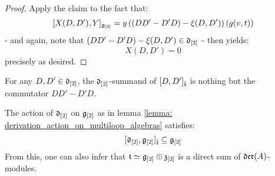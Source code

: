 \begin{proof}
                Apply the claim to the fact that:
                    $$[X(D, D'), Y]_{\mathfrak{g}_{[2]}} = y \left( ( DD' - D'D) - \xi(D, D') \right)( g(v, t) )$$
                - and again, note that $( DD' - D'D) - \xi(D, D') \in \mathfrak{d}_{[2]}$ - then yields:
                    $$X(D, D') = 0$$
                precisely as desired. 
            \end{proof}
        \begin{corollary}
            For any $D, D' \in \mathfrak{d}_{[2]}$, the $\mathfrak{d}_{[2]}$-summand of $[D, D']_{\hat{\mathfrak{t}}}$ is nothing but the commutator $DD' - D'D$.
        \end{corollary} 
        \begin{corollary} \label{coro: derivation_action_on_multiloop_algebras}
            The action of $\mathfrak{d}_{[2]}$ on $\mathfrak{g}_{[2]}$ as in lemma \ref{lemma: derivation_action_on_multiloop_algebras} satisfies:
                $$[\mathfrak{d}_{[2]}, \mathfrak{g}_{[2]}]_{\hat{\mathfrak{t}}} \subseteq \mathfrak{g}_{[2]}$$
            From this, one can also infer that $\mathfrak{t} \simeq \mathfrak{g}_{[2]} \oplus \mathfrak{z}_{[2]}$ is a direct sum of $\mathfrak{der}(A)$-modules. 
        \end{corollary}
